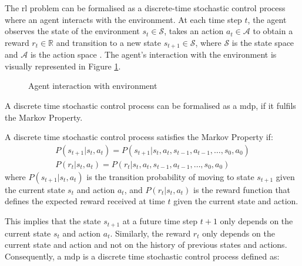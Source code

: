 The \acrshort{rl} problem can be formalised as a discrete-time stochastic control process where an agent interacts with the environment. At each time step $t$, the agent observes the state of the environment $s_t \in \mathcal{S}$, takes an action $a_t \in \mathcal{A}$ to obtain a reward $r_t \in \mathbb{R}$ and transition to a new state $s_{t+1} \in \mathcal{S}$, where $\mathcal{S}$ is the state space and $\mathcal{A}$ is the action space \cite{Francois-Lavet2018}. The agent's interaction with the environment is visually represented in Figure \ref{fig:agent_environment_interaction}.

\begin{figure}[ht]
    \centering
    
    \caption{Agent interaction with environment}
    \label{fig:agent_environment_interaction}
\end{figure}

A discrete time stochastic control process can be formalised as a \acrfull{mdp}, if it fulfils the Markov Property. 

\begin{definition}
    A discrete time stochastic control process satisfies the Markov Property if:
    \begin{eqnarray}
        P(s_{t+1} | s_t, a_t) = P(s_{t+1} | s_t, a_t, s_{t-1}, a_{t-1}, \dots, s_0, a_0) \\  
        P(r_t | s_t, a_t) = P(r_t | s_t, a_t, s_{t-1}, a_{t-1}, \dots, s_0, a_0)
    \end{eqnarray}
    where $P(s_{t+1} | s_t, a_t)$ is the transition probability of moving to state $s_{t+1}$ given the current state $s_t$ and action $a_t$, and $P(r_t | s_t, a_t)$ is the reward function that defines the expected reward received at time $t$ given the current state and action.
\end{definition}

This implies that the state $s_{t+1}$ at a future time step $t+1$ only depends on the current state $s_t$ and action $a_t$. Similarly, the reward $r_t$ only depends on the current state and action and not on the history of previous states and actions. Consequently, a \acrlong{mdp} \cite{Bellman1957} is a discrete time stochastic control process defined as:

